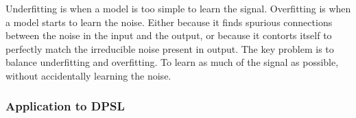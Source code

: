 Underfitting is when a model is too simple to learn the signal. Overfitting is when a model starts to learn the noise. Either because it finds spurious connections between the noise in the input and the output, or because it contorts itself to perfectly match the irreducible noise present in output. The key problem is to balance underfitting and overfitting. To learn as much of the signal as possible, without accidentally learning the noise.

\subsubsection{Application to DPSL}
